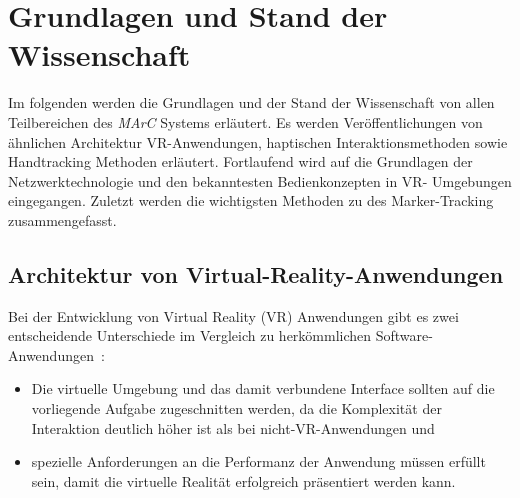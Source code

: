 \section{Grundlagen und Stand der Wissenschaft} \label{sec:grundlagen}
Im folgenden werden die Grundlagen und der Stand der Wissenschaft von allen Teilbereichen des \textit{MArC} Systems erläutert. Es werden Veröffentlichungen von ähnlichen Architektur VR-Anwendungen, haptischen Interaktionsmethoden sowie Handtracking Methoden erläutert. Fortlaufend wird auf die Grundlagen der Netzwerktechnologie und den bekanntesten Bedienkonzepten in VR- Umgebungen eingegangen. Zuletzt werden die wichtigsten Methoden zu des Marker-Tracking zusammengefasst.

\subsection{Architektur von Virtual-Reality-Anwendungen}\label{sec:ArchitekturAnwendungen}
Bei der Entwicklung von Virtual Reality (VR) Anwendungen gibt es zwei entscheidende Unterschiede im Vergleich zu herkömmlichen Software-Anwendungen~\cite{bryson1995approaches}:
\begin{itemize}
	\item Die virtuelle Umgebung und das damit verbundene Interface sollten auf die vorliegende Aufgabe zugeschnitten werden, da die Komplexität der Interaktion deutlich höher ist als bei nicht-VR-Anwendungen und
	\item spezielle Anforderungen an die Performanz der Anwendung müssen erfüllt sein, damit die virtuelle Realität erfolgreich präsentiert werden kann.
\end{itemize}

